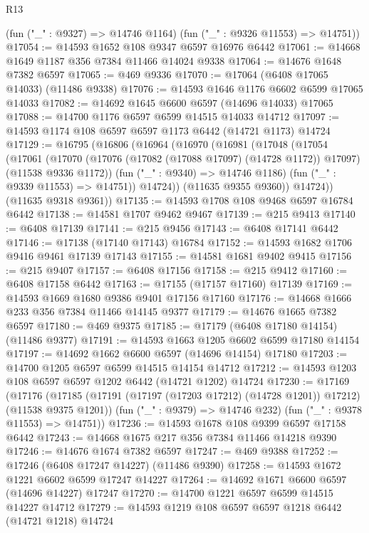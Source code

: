 \begin{lexlean}{R13}
\begin{coremodule}
      (fun ("_" : @9327) => @14746 @1164)
      (fun ("_" : @9326 @11553) => @14751))
@17054 := @14593 @1652 @108 @9347 @6597 @16976 @6442
@17061 := @14668 @1649 @1187 @356 @7384 @11466 @14024 @9338
@17064 := @14676 @1648 @7382 @6597
@17065 := @469 @9336
@17070 := @17064 (@6408 @17065 @14033) (@11486 @9338)
@17076 := @14593 @1646 @1176 @6602 @6599 @17065 @14033
@17082 := @14692 @1645 @6600 @6597 (@14696 @14033) @17065
@17088 := @14700 @1176 @6597 @6599 @14515 @14033 @14712
@17097 := @14593 @1174 @108 @6597 @6597 @1173 @6442 (@14721 @1173) @14724
@17129 := @16795
    (@16806
      (@16964
        (@16970
          (@16981
            (@17048
              (@17054
                (@17061
                  (@17070
                    (@17076 (@17082 (@17088 @17097) (@14728 @1172)) @17097)
                    (@11538 @9336 @1172))
                  (fun ("_" : @9340) => @14746 @1186)
                  (fun ("_" : @9339 @11553) => @14751))
                @14724))
            (@11635 @9355 @9360))
          @14724))
      (@11635 @9318 @9361))
@17135 := @14593 @1708 @108 @9468 @6597 @16784 @6442
@17138 := @14581 @1707 @9462 @9467
@17139 := @215 @9413
@17140 := @6408 @17139
@17141 := @215 @9456
@17143 := @6408 @17141 @6442
@17146 := @17138 (@17140 @17143) @16784
@17152 := @14593 @1682 @1706 @9416 @9461 @17139 @17143
@17155 := @14581 @1681 @9402 @9415
@17156 := @215 @9407
@17157 := @6408 @17156
@17158 := @215 @9412
@17160 := @6408 @17158 @6442
@17163 := @17155 (@17157 @17160) @17139
@17169 := @14593 @1669 @1680 @9386 @9401 @17156 @17160
@17176 := @14668 @1666 @233 @356 @7384 @11466 @14145 @9377
@17179 := @14676 @1665 @7382 @6597
@17180 := @469 @9375
@17185 := @17179 (@6408 @17180 @14154) (@11486 @9377)
@17191 := @14593 @1663 @1205 @6602 @6599 @17180 @14154
@17197 := @14692 @1662 @6600 @6597 (@14696 @14154) @17180
@17203 := @14700 @1205 @6597 @6599 @14515 @14154 @14712
@17212 := @14593 @1203 @108 @6597 @6597 @1202 @6442 (@14721 @1202) @14724
@17230 := @17169
    (@17176
      (@17185 (@17191 (@17197 (@17203 @17212) (@14728 @1201)) @17212) (@11538 @9375 @1201))
      (fun ("_" : @9379) => @14746 @232)
      (fun ("_" : @9378 @11553) => @14751))
@17236 := @14593 @1678 @108 @9399 @6597 @17158 @6442
@17243 := @14668 @1675 @217 @356 @7384 @11466 @14218 @9390
@17246 := @14676 @1674 @7382 @6597
@17247 := @469 @9388
@17252 := @17246 (@6408 @17247 @14227) (@11486 @9390)
@17258 := @14593 @1672 @1221 @6602 @6599 @17247 @14227
@17264 := @14692 @1671 @6600 @6597 (@14696 @14227) @17247
@17270 := @14700 @1221 @6597 @6599 @14515 @14227 @14712
@17279 := @14593 @1219 @108 @6597 @6597 @1218 @6442 (@14721 @1218) @14724

\end{coremodule}
\end{lexlean}
